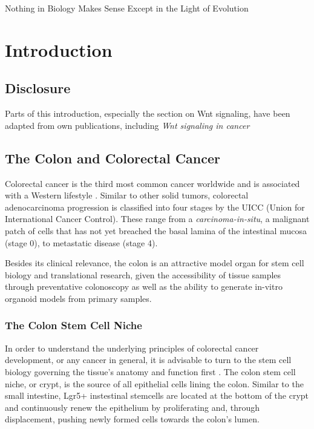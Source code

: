 \begin{savequote}[75mm]
Nothing in Biology Makes Sense Except in the Light of Evolution
\end{savequote}

\chapter{Introduction}
\label{introduction}
\begin{flushleft}
\setlength{\parindent}{7ex}
\section{Disclosure}
Parts of this introduction, especially the section on Wnt signaling, have been adapted from own publications, including \textit{Wnt signaling in cancer} \cite{Zhan2017}

\section{The Colon and Colorectal Cancer}

Colorectal cancer is the third most common cancer worldwide and is associated with a Western lifestyle \cite{BrayGlobalCancerStatistics}. Similar to other solid tumors, colorectal adenocarcinoma progression is classified into four stages by the UICC (Union for International Cancer Control). These range from a \textit{carcinoma-in-situ}, a malignant patch of cells that has not yet breached the basal lamina of the intestinal mucosa (stage 0), to metastatic disease (stage 4).\par

Besides its clinical relevance, the colon is an attractive model organ for stem cell biology and translational research, given the accessibility of tissue samples through preventative colonoscopy as well as the ability to generate in-vitro organoid models from primary samples.

\subsection{The Colon Stem Cell Niche}

In order to understand the underlying principles of colorectal cancer development, or any cancer in general, it is advisable to turn to the stem cell biology governing the tissue's anatomy and function first \cite{CleversCancerStemCell}. The colon stem cell niche, or crypt, is the source of all epithelial cells lining the colon. Similar to the small intestine, Lgr5+ instestinal stemcells are located at the bottom of the crypt and continuously renew the epithelium by proliferating and, through displacement, pushing newly formed cells towards the colon's lumen.\par


\end{flushleft}

